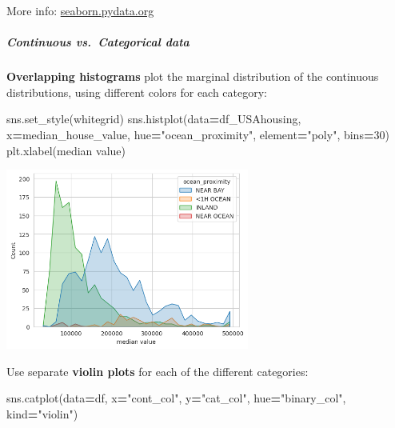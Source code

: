 \documentclass[
]{book}
\newenvironment{Shaded}{\begin{snugshade}}{\end{snugshade}}
\newcommand{\DecValTok}[1]{\textcolor[rgb]{0.00,0.00,0.81}{#1}}
\newcommand{\NormalTok}[1]{#1}
\newcommand{\OperatorTok}[1]{\textcolor[rgb]{0.81,0.36,0.00}{\textbf{#1}}}
\newcommand{\StringTok}[1]{\textcolor[rgb]{0.31,0.60,0.02}{#1}}
\begin{document}
More info:
\href{https://seaborn.pydata.org/tutorial/relational.html}{seaborn.pydata.org}

\hypertarget{continuous-vs.-categorical-data}{%
\subparagraph{Continuous vs.~Categorical data}\label{continuous-vs.-categorical-data}}

\textbf{Overlapping histograms} plot the marginal distribution of the
continuous distributions, using different colors for each category:

\begin{Shaded}
\begin{Highlighting}[]
\NormalTok{sns.set\_style(}\StringTok{\textquotesingle{}whitegrid\textquotesingle{}}\NormalTok{)}
\NormalTok{sns.histplot(data}\OperatorTok{=}\NormalTok{df\_USAhousing, x}\OperatorTok{=}\StringTok{\textquotesingle{}median\_house\_value\textquotesingle{}}\NormalTok{, hue}\OperatorTok{=}\StringTok{"ocean\_proximity"}\NormalTok{, element}\OperatorTok{=}\StringTok{"poly"}\NormalTok{,  bins}\OperatorTok{=}\DecValTok{30}\NormalTok{)}
\NormalTok{plt.xlabel(}\StringTok{\textquotesingle{}median value\textquotesingle{}}\NormalTok{)}
\end{Highlighting}
\end{Shaded}

\includegraphics[width=0.6\textwidth,height=\textheight]{figures/overlap_hist_usa_housing.png}

Use separate \textbf{violin plots} for each of the different categories:

\begin{Shaded}
\begin{Highlighting}[]
\NormalTok{sns.catplot(data}\OperatorTok{=}\NormalTok{df, x}\OperatorTok{=}\StringTok{"cont\_col"}\NormalTok{, y}\OperatorTok{=}\StringTok{"cat\_col"}\NormalTok{, hue}\OperatorTok{=}\StringTok{"binary\_col"}\NormalTok{, kind}\OperatorTok{=}\StringTok{"violin"}\NormalTok{)}
\end{Highlighting}
\end{Shaded}
\end{document}
